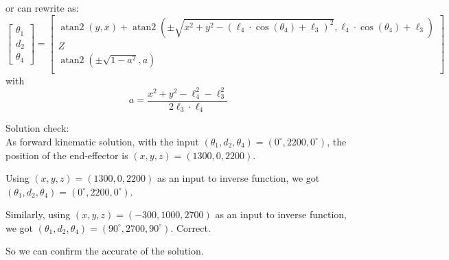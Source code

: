     or can rewrite as:
    \begin{equation*}
        \begin{bmatrix}
            \theta_1  \\
            d_2 \\
            \theta_4 
            \end{bmatrix}
        = 
        \begin{bmatrix}
            \operatorname{atan2}(y, x) + \operatorname{atan2}\left( \pm \sqrt{x^2 + y^2 - \left( \ell_4 \cdot \cos(\theta_4) + \ell_3 \right)^2}, \ell_4 \cdot \cos(\theta_4) + \ell_3 \right) \\
            Z \\
            \operatorname{atan2}\left(\pm \sqrt{1 - a^2}, a \right) \\
            \end{bmatrix}
    \end{equation*}
    with
    \begin{equation*}
        a = \frac{x^2 + y^2 - \ell_4^2 - \ell_3^2}{2 \ell_3 \cdot \ell_4}
    \end{equation*}

Solution check:\\

    As forward kinematic solution, with the input \( (\theta_1, d_2, \theta_4) = (0^\circ, 2200, 0^\circ) \), the position of the end-effector is \( (x, y, z) = (1300, 0, 2200) \).

    Using \( (x, y, z) = (1300, 0, 2200) \) as an input to inverse function, we got \( (\theta_1, d_2, \theta_4)  = (0^\circ, 2200, 0^\circ) \).
    
    Similarly, using \( (x,y,z) = (-300,1000,2700) \) as an input to inverse function, we got \( (\theta_1, d_2, \theta_4) = (90^\circ,2700, 90^\circ) \). Correct.
    
    So we can confirm the accurate of the solution.
